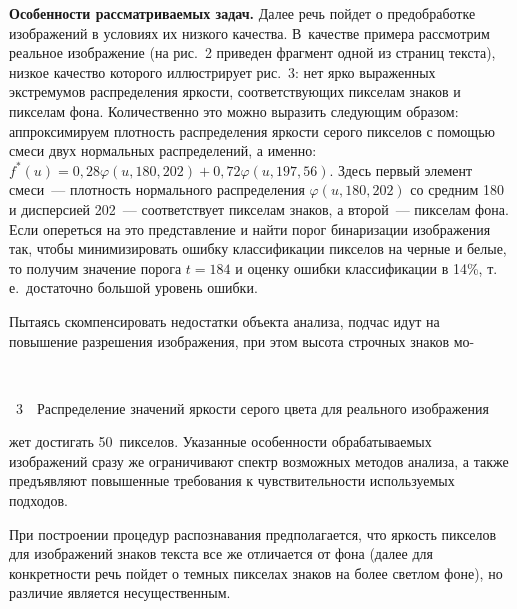 \begin{multicols}{2}
      \smallskip
      \textbf{Особенности рассматриваемых задач.} Далее речь пойдет о 
предобработке изображений в условиях их низкого качества. В~качестве примера 
рас\-смот\-рим реальное изображение (на рис.~2 приведен фрагмент одной из страниц 
текста), низкое качество которого иллюстрирует рис.~3: нет ярко выраженных 
экстремумов распределения яр\-кости, соответствующих пикселам знаков и пикселам фона. 
Количественно это можно выразить следующим образом: аппроксимируем плот\-ность 
распределения яркости серого пикселов с помощью смеси двух нормальных 
распределений, а именно: $f^*(u)=0{,}28\varphi (u,180,202)+0{,}72\varphi(u,197,56)$. Здесь
первый элемент смеси~--- плотность нормального распределения $\varphi(u,180,202)$ со 
средним 180 и дисперсией 202~--- соответствует пикселам знаков, а второй~--- пикселам 
фона. Если опереться на это представление и найти порог бинаризации изображения так, 
чтобы минимизировать ошибку классификации пикселов на черные и белые, то получим 
значение порога $t=184$ и оценку ошибки классификации в 14\%, т.\,е.\ достаточно 
большой уровень ошибки.



      Пытаясь скомпенсировать недостатки объекта анализа, подчас идут на повышение 
разрешения  изображения, при этом высота строчных знаков мо-\linebreak\vspace*{-12pt}
\vspace*{18pt}
\begin{center}  %
  \mbox{%
 \epsfxsize=76.298mm %
 }
 \end{center}
{{\figurename~3}\ \ \small{Распределение значений яркости серого цвета для реального изображения}}





\addtocounter{figure}{1}


\noindent
жет достигать 
50~пикселов. Указанные особенности обрабатываемых изображений сразу же 
ограничивают спектр возможных методов анализа, а также предъявляют повышенные 
требования к чувствительности используемых подходов. 
      
      При построении процедур распознавания предполагается, что яркость пикселов для 
изображений знаков текста все же отличается от фона (далее для конкретности речь 
пойдет о темных пикселах знаков на более светлом фоне), но различие является 
несущественным.
      

\end{multicols}
